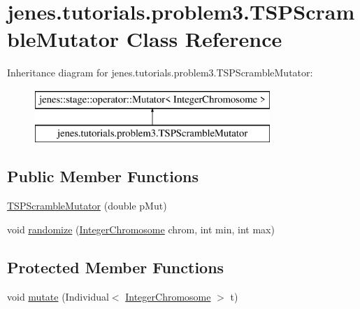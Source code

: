 \hypertarget{classjenes_1_1tutorials_1_1problem3_1_1_t_s_p_scramble_mutator}{\section{jenes.\-tutorials.\-problem3.\-T\-S\-P\-Scramble\-Mutator Class Reference}
\label{classjenes_1_1tutorials_1_1problem3_1_1_t_s_p_scramble_mutator}
}
Inheritance diagram for jenes.\-tutorials.\-problem3.\-T\-S\-P\-Scramble\-Mutator\-:\begin{figure}[H]
\begin{center}
\leavevmode
\includegraphics[height=2.000000cm]{classjenes_1_1tutorials_1_1problem3_1_1_t_s_p_scramble_mutator}
\end{center}
\end{figure}
\subsection*{Public Member Functions}
\begin{DoxyCompactItemize}
\item 
\hyperlink{classjenes_1_1tutorials_1_1problem3_1_1_t_s_p_scramble_mutator_a405cbd7c659b7f1053399d0fa9a5b942}{T\-S\-P\-Scramble\-Mutator} (double p\-Mut)
\item 
void \hyperlink{classjenes_1_1tutorials_1_1problem3_1_1_t_s_p_scramble_mutator_a42d01f9f0cd8138659b8e76fdc41cd1e}{randomize} (\hyperlink{classjenes_1_1chromosome_1_1_integer_chromosome}{Integer\-Chromosome} chrom, int min, int max)
\end{DoxyCompactItemize}
\subsection*{Protected Member Functions}
\begin{DoxyCompactItemize}
\item 
void \hyperlink{classjenes_1_1tutorials_1_1problem3_1_1_t_s_p_scramble_mutator_ab355f07bb36d37f05a81eac0cc110b42}{mutate} (Individual$<$ \hyperlink{classjenes_1_1chromosome_1_1_integer_chromosome}{Integer\-Chromosome} $>$ t)
\end{DoxyCompactItemize}


